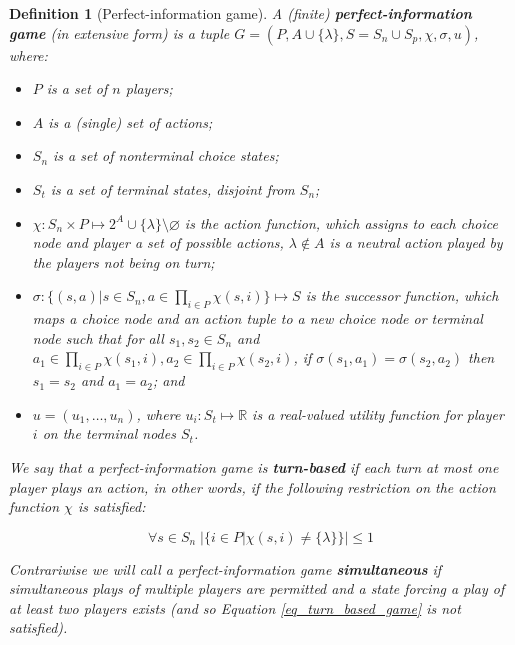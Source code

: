 \newtheorem*{defgpig}{Definition}
\begin{defgpig}[Perfect-information game]

A (finite) \textbf{perfect-information game} (in extensive form) is a tuple $G =
(P,A\cup\{\lambda\},S=S_n\cup S_p,\chi,\sigma,u)$, where:

\begin{itemize}

\item $P$ is a set of $n$ players;

\item $A$ is a (single) set of actions;

\item $S_n$ is a set of nonterminal choice states;

\item $S_t$ is a set of terminal states, disjoint from $S_n$;

\item $\chi: S_n \times P \mapsto 2^A \cup \{\lambda\} \setminus \varnothing$ is the action 
 function, which assigns to each choice node and player a set of possible actions, $\lambda \notin
 A$ is a neutral action played by the players not being on turn;

\item $\sigma: \{(s,a)| s \in S_n, a \in \prod\limits_{i\in P}\chi(s,i)\} \mapsto S$ is the
successor function, which maps a choice node and an action tuple to a new choice node or
terminal node such that for all $s_1, s_2 \in S_n$ and $a_1 \in \prod\limits_{i\in
P}\chi(s_1,i), a_2 \in \prod\limits_{i\in P}\chi(s_2,i)$, if 
$\sigma(s_1,a_1) = \sigma(s_2,a_2)$ then $s_1=s_2$ and $a_1=a_2$; and

\item $u = (u_1,\ldots,u_n)$, where $u_i: S_t \mapsto \mathbb{R}$ is a real-valued utility
function for player $i$ on the terminal nodes $S_t$.

\end{itemize}

We say that a perfect-information game is \textbf{turn-based} if each turn at most one player
plays an action, in other words, if the following restriction on the action function $\chi$ is satisfied:

\begin{equation}
\label{eq_turn_based_game}
\forall s \in S_n \; |\{i \in P|\chi(s,i) \not= \{\lambda\}\}| \le 1
\end{equation}

Contrariwise we will call a perfect-information game \textbf{simultaneous} if simultaneous
plays of multiple players are permitted and a state forcing a play of at least two players
exists (and so Equation \ref{eq_turn_based_game} is not satisfied).

\end{defgpig}

